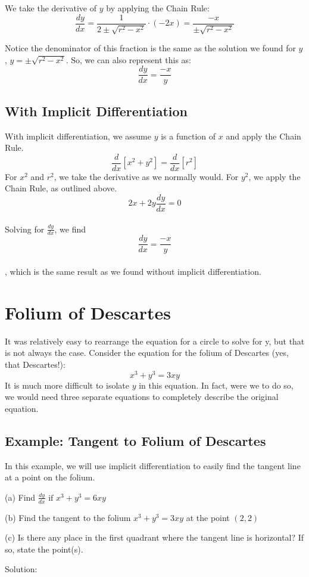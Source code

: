 We take the derivative of $y$ by applying the Chain Rule:
$$\frac{dy}{dx}=\frac{1}{2 \pm \sqrt{r^2 - x^2}} \cdot (- 2x) = 
\frac{-x}{\pm \sqrt{r^2 - x^2}}$$ 

Notice the denominator of this fraction is the same as the solution 
we found for $y$, $y=\pm \sqrt{r^2-x^2}$. So, we can also represent 
this as: $$\frac{dy}{dx}=\frac{-x}{y}$$

\subsection{With Implicit Differentiation}
With implicit differentiation, we assume $y$ is a function of $x$ and 
apply the Chain Rule. $$\frac{d}{dx}[x^2+y^2]=\frac{d}{dx}[r^2]$$ For 
$x^2$ and $r^2$, we take the derivative as we normally would. For 
$y^2$, we apply the Chain Rule, as outlined above. 
$$2x+2y\frac{dy}{dx}=0$$\\ Solving for $\frac{dy}{dx}$, we find 
$$\frac{dy}{dx}=\frac{-x}{y}$$ \\, which is the same result as we found 
without implicit differentiation. 

\section{Folium of Descartes}
It was relatively easy to rearrange the equation for a circle to 
solve for y, but that is not always the case. Consider the equation 
for the folium of Descartes (yes, that Descartes!): $$x^3+y^3=3xy$$ 
It is much more difficult to isolate $y$ in this equation. In fact, 
were we to do so, we would need three separate equations to completely 
describe the original equation. 

\subsection{Example: Tangent to Folium of Descartes}

In this example, we will use implicit differentiation to easily find 
the tangent line at a point on the folium. 

(a) Find $\frac{dy}{dx} \text{ if } x^3+y^3 = 6xy$

(b) Find the tangent to the folium $x^3+y^3=3xy$ at the point $(2, 2)$

(c) Is there any place in the first quadrant where the tangent line 
is horizontal? If so, state the point(s). 

Solution:

